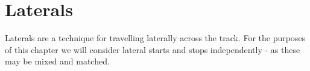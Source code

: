 \chapter{Laterals}
\label{ch:laterals}

Laterals are a technique for travelling laterally across the track. 
For the purposes of this chapter we will consider lateral starts and stops independently - as these may be mixed and matched.  
